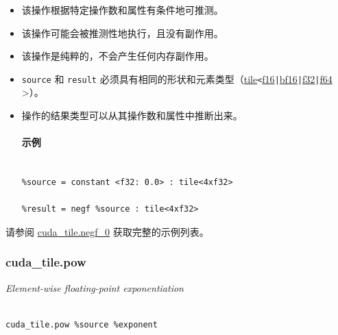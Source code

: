 \documentclass{article}
\begin{document}
\begin{itemize}
\item 该操作根据特定操作数和属性有条件地可推测。
\item 该操作可能会被推测性地执行，且没有副作用。
\item 该操作是纯粹的，不会产生任何内存副作用。
\item \texttt{source} 和 \texttt{result} 必须具有相同的形状和元素类型（\href{https://docs.nvidia.com/cuda/tile-ir/latest/sections/types.html#type-tile}{tile}\texttt{<}\href{https://docs.nvidia.com/cuda/tile-ir/latest/sections/types.html#subsection-element-types}{f16}\texttt{|}\href{https://docs.nvidia.com/cuda/tile-ir/latest/sections/types.html#subsection-element-types}{bf16}\texttt{|}\href{https://docs.nvidia.com/cuda/tile-ir/latest/sections/types.html#subsection-element-types}{f32}\texttt{|}\href{https://docs.nvidia.com/cuda/tile-ir/latest/sections/types.html#subsection-element-types}{f64} >）。
\item 操作的结果类型可以从其操作数和属性中推断出来。




\paragraph{示例}


\begin{lstlisting}

%source = constant <f32: 0.0> : tile<4xf32>

%result = negf %source : tile<4xf32>

\end{lstlisting}



\end{itemize}
请参阅 \href{https://docs.nvidia.com/cuda/tile-ir/latest/sections/appendix.html#example-cuda-tile-negf-0}{cuda\_tile.negf\_0} 获取完整的示例列表。





\subsubsection{cuda\_tile.pow}


\textit{Element-wise floating-point exponentiation}




\begin{lstlisting}

cuda_tile.pow %source %exponent

\end{lstlisting}
\end{document}

